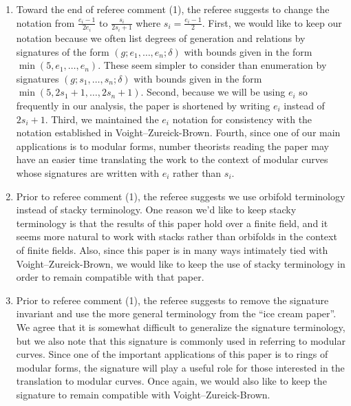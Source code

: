 \documentclass[10 pt]{amsart}
\theoremstyle{plain}
\theoremstyle{definition}
\theoremstyle{remark}
\numberwithin{equation}{section}
\begin{document}
\begin{enumerate}
	\item Toward the end of referee comment (1), the referee suggests
		to change the notation from $\frac{e_i - 1}{2 e_i}$
		to $\frac{s_i}{2 s_i + 1}$ where $s_i = \frac{e_i - 1}{2}$.
		First, we would like to keep our notation because we often
	list degrees of generation and relations by signatures
	of the form $(g; e_1, \ldots, e_n; \delta)$ with bounds given in
	the form $\min(5, e_1, \ldots, e_n)$. These
	seem simpler to
	consider than enumeration by signatures $(g; s_1, \ldots, s_n;
	\delta)$ with bounds given in the form $\min(5, 2s_1 + 1, \ldots,
	2s_n + 1)$. Second, because we will be using $e_i$
	so frequently in our analysis, the paper is shortened
	by writing $e_i$ instead of $2s_i+1$.
	Third, we maintained the $e_i$ notation for consistency
	with the notation established in Voight--Zureick-Brown.
	Fourth, since one of our main applications is to modular forms,
	number theorists reading the paper may have an easier time
	translating the work to the context of modular curves whose 
	signatures are written with $e_i$ rather than $s_i$.
	\item Prior to referee comment (1), the referee suggests we use 
orbifold terminology instead
		of stacky terminology. 
		One reason we'd like to keep stacky terminology is
		that the results of this paper hold over a finite field,
		and it seems more natural to 
work with	stacks rather than orbifolds in the context of finite fields.
		Also, since this paper is in many
		ways intimately tied with Voight--Zureick-Brown,
		we would like to keep the use of stacky terminology
		in order to remain compatible with that paper.
	\item Prior to referee comment (1), the referee suggests to 
remove the signature invariant
		and use the more general terminology from the
		``ice cream paper''. We agree that it is
		somewhat difficult to generalize the
		signature terminology, but we also note that this signature is
		commonly used in referring
		to modular curves. Since one of the important
		applications of this paper is to rings of modular
		forms, the signature will play a useful role for
		those interested in the translation to modular curves.
		Once again, we would also like to keep the signature
		to remain compatible with Voight--Zureick-Brown.
\end{enumerate}
\end{document}
